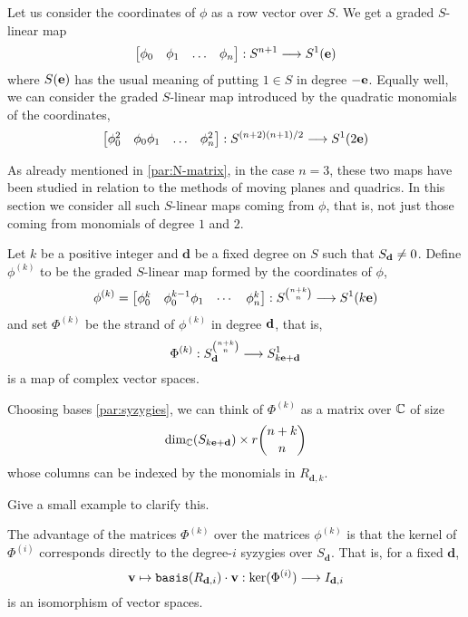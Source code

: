 \documentclass[fleqn,reqno]{amsart}
\numberwithin{first}{chapter}
\begin{document}
\begin{paragraf}
\label{par:all-phi-k}
Let us consider the coordinates of $\phi$ as a row vector over $S$. We get a graded $S$-linear map
\[
\begin{bmatrix}
	\phi_0& \phi_1& \ldots& \phi_n
\end{bmatrix}:S^{n+1}\longrightarrow S^1(\mathbf e)
\]
where $S(\mathbf e)$ has the usual meaning of putting $1\in S$ in degree $-\mathbf e$.
Equally well, we can consider the graded $S$-linear map introduced by the quadratic monomials
of the coordinates,
\[
\begin{bmatrix}
	\phi_0^2& \phi_0\phi_1& \ldots& \phi_n^2
\end{bmatrix}:S^{(n+2)(n+1)/2}\longrightarrow S^1(2\mathbf e)
\]

As already mentioned in \eqref{par:N-matrix}, in the case $n=3$,
these two maps have been studied in relation to the methods of moving planes and quadrics.
In this section we consider all such $S$-linear maps coming from $\phi$,
that is, not just those coming from monomials of degree $1$ and $2$.
\end{paragraf}

\begin{paragraf}
\label{par:strands}
Let $k$ be a positive integer and $\mathbf d$ be a fixed degree on $S$ such that $S_\mathbf d\neq0$.
Define $\phi^{(k)}$ to be the graded $S$-linear map formed by the coordinates of $\phi$,
\[
\phi^{(k)}=\begin{bmatrix}\phi_0^k& \phi_0^{k-1}\phi_1& \cdots& \phi_n^k\end{bmatrix}:
S^{\binom{n+k}{n}}\longrightarrow S^1(k\mathbf e)
\]
and set $\Phi^{(k)}$ be the strand of $\phi^{(k)}$ in degree $\mathbf d$, that is,
\[
\Phi^{(k)}:S_{\mathbf d}^{\binom{n+k}{n}}\longrightarrow S_{k\mathbf e+\mathbf d}^1
\]
is a map of complex vector spaces.

Choosing bases \eqref{par:syzygies}, we can think of $\Phi^{(k)}$ as a matrix over $\mathbb{C}$ of size
\[
\dim_{\mathbb{C}}(S_{k\mathbf e+\mathbf d})\times r\binom{n+k}{n}
\]
whose columns can be indexed by the monomials in $R_{\mathbf d,k}$.
\end{paragraf}

\begin{example}[$\mt{ex202}$]
\label{ex202}
Give a small example to clarify this.
\end{example}

\begin{paragraf}
\label{par:syzygies-kernel}
The advantage of the matrices $\Phi^{(k)}$ over the matrices $\phi^{(k)}$
is that the kernel of $\Phi^{(i)}$ corresponds directly to the degree-$i$ syzygies over $S_{\mathbf d}$.
That is, for a fixed $\mathbf d$,
\[
\mathbf v\mapsto\mathop{\tt basis}(R_{\mathbf d,i})\cdot \mathbf v:\ker(\Phi^{(i)})\longrightarrow I_{\mathbf d, i}
\]
is an isomorphism of vector spaces.
\end{paragraf}
\end{document}
